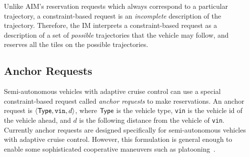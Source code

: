 Unlike AIM's reservation requests which always correspond to a
particular trajectory, a constraint-based request is an
\emph{incomplete} description of the trajectory.  Therefore, the IM
interprets a constraint-based request as a description of a set of
\emph{possible} trajectories that the vehicle may follow, and reserves
all the tiles on the possible trajectories.

\subsection{Anchor Requests}
\label{sec:anchor}

Semi-autonomous vehicles with adaptive cruise control can use a special
constraint-based request called \emph{anchor requests} to make
reservations. An anchor request is $\langle {\sf Type}, \texttt{vin},
d \rangle$, where ${\sf Type}$ is the vehicle type, \texttt{vin} is
the vehicle id of the vehicle ahead, and $d$ is the following
distance from the vehicle of \texttt{vin}. 
Currently anchor requests are designed specifically for
semi-autonomous vehicles with adaptive cruise control.  However, this
formulation is general enough to enable some sophisticated cooperative
maneuvers such as platooning~\cite{bib:Sheikholeslam90Longitudinal}.











